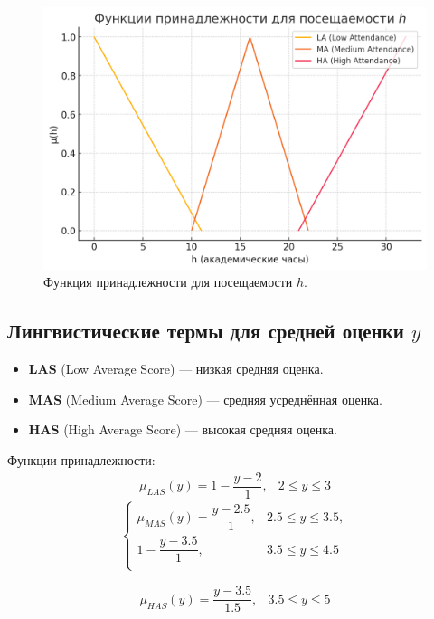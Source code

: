 \documentclass{article}
\begin{document}
\begin{figure}[h!]
    \centering
    \includegraphics[width=0.8\linewidth]{membership_h.png}
    \caption{Функция принадлежности для посещаемости $h$.}
    \label{fig:membership_h}
\end{figure}

\newpage
\subsection{Лингвистические термы для средней оценки $y$}

\begin{itemize}
    \item \textbf{LAS} (Low Average Score) — низкая средняя оценка.
    \item \textbf{MAS} (Medium Average Score) — средняя усреднённая оценка.
    \item \textbf{HAS} (High Average Score) — высокая средняя оценка.
\end{itemize}

Функции принадлежности:
\begin{align*}
\mu_{LAS}(y) = 1 - \dfrac{y - 2}{1}, & 2 \le y \le 3
\end{align*}
\[
\begin{cases}
\mu_{MAS}(y) =
\dfrac{y - 2.5}{1}, & 2.5 \le y \le 3.5,\\
1 - \dfrac{y - 3.5}{1}, & 3.5 \le y \le 4.5\\
\end{cases}
\]

\begin{align*}
\mu_{HAS}(y) = \dfrac{y - 3.5}{1.5}, & 3.5 \le y \le 5
\end{align*}
\end{document}
